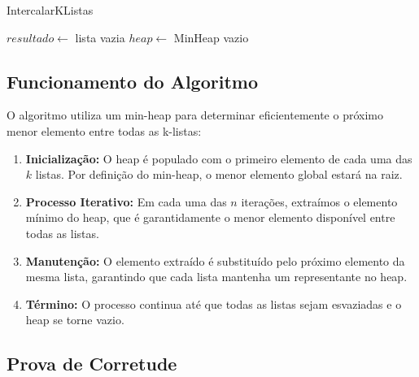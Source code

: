 \documentclass[a4paper,12pt]{article}
\begin{document}
\begin{algorithm}[H]
\SetAlgoLined
\caption{IntercalarKListas}


$resultado \leftarrow$ lista vazia\;
$heap \leftarrow$ MinHeap vazio 



\;
\end{algorithm}
\newpage
\subsection*{Funcionamento do Algoritmo}

O algoritmo utiliza um min-heap para determinar eficientemente o próximo menor elemento entre todas as k-listas:

\begin{enumerate}
    \item \textbf{Inicialização:} O heap é populado com o primeiro elemento de cada uma das $k$ listas. Por definição do min-heap, o menor elemento global estará na raiz.
    
    \item \textbf{Processo Iterativo:} Em cada uma das $n$ iterações, extraímos o elemento mínimo do heap, que é garantidamente o menor elemento disponível entre todas as listas.
    
    \item \textbf{Manutenção:} O elemento extraído é substituído pelo próximo elemento da mesma lista, garantindo que cada lista mantenha um representante no heap.
    
    \item \textbf{Término:} O processo continua até que todas as listas sejam esvaziadas e o heap se torne vazio.
\end{enumerate}

\subsection*{Prova de Corretude}
\end{document}
